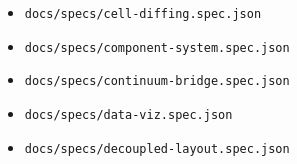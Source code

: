 \begin{itemize}
\item
  \texttt{d\allowbreak{}o\allowbreak{}c\allowbreak{}s\allowbreak{}/\allowbreak{}s\allowbreak{}p\allowbreak{}e\allowbreak{}c\allowbreak{}s\allowbreak{}/\allowbreak{}c\allowbreak{}e\allowbreak{}l\allowbreak{}l\allowbreak{}-\allowbreak{}d\allowbreak{}i\allowbreak{}f\allowbreak{}f\allowbreak{}i\allowbreak{}n\allowbreak{}g\allowbreak{}.\allowbreak{}s\allowbreak{}p\allowbreak{}e\allowbreak{}c\allowbreak{}.\allowbreak{}j\allowbreak{}s\allowbreak{}o\allowbreak{}n}
\item
  \texttt{d\allowbreak{}o\allowbreak{}c\allowbreak{}s\allowbreak{}/\allowbreak{}s\allowbreak{}p\allowbreak{}e\allowbreak{}c\allowbreak{}s\allowbreak{}/\allowbreak{}c\allowbreak{}o\allowbreak{}m\allowbreak{}p\allowbreak{}o\allowbreak{}n\allowbreak{}e\allowbreak{}n\allowbreak{}t\allowbreak{}-\allowbreak{}s\allowbreak{}y\allowbreak{}s\allowbreak{}t\allowbreak{}e\allowbreak{}m\allowbreak{}.\allowbreak{}s\allowbreak{}p\allowbreak{}e\allowbreak{}c\allowbreak{}.\allowbreak{}j\allowbreak{}s\allowbreak{}o\allowbreak{}n}
\item
  \texttt{d\allowbreak{}o\allowbreak{}c\allowbreak{}s\allowbreak{}/\allowbreak{}s\allowbreak{}p\allowbreak{}e\allowbreak{}c\allowbreak{}s\allowbreak{}/\allowbreak{}c\allowbreak{}o\allowbreak{}n\allowbreak{}t\allowbreak{}i\allowbreak{}n\allowbreak{}u\allowbreak{}u\allowbreak{}m\allowbreak{}-\allowbreak{}b\allowbreak{}r\allowbreak{}i\allowbreak{}d\allowbreak{}g\allowbreak{}e\allowbreak{}.\allowbreak{}s\allowbreak{}p\allowbreak{}e\allowbreak{}c\allowbreak{}.\allowbreak{}j\allowbreak{}s\allowbreak{}o\allowbreak{}n}
\item
  \texttt{d\allowbreak{}o\allowbreak{}c\allowbreak{}s\allowbreak{}/\allowbreak{}s\allowbreak{}p\allowbreak{}e\allowbreak{}c\allowbreak{}s\allowbreak{}/\allowbreak{}d\allowbreak{}a\allowbreak{}t\allowbreak{}a\allowbreak{}-\allowbreak{}v\allowbreak{}i\allowbreak{}z\allowbreak{}.\allowbreak{}s\allowbreak{}p\allowbreak{}e\allowbreak{}c\allowbreak{}.\allowbreak{}j\allowbreak{}s\allowbreak{}o\allowbreak{}n}
\item
  \texttt{d\allowbreak{}o\allowbreak{}c\allowbreak{}s\allowbreak{}/\allowbreak{}s\allowbreak{}p\allowbreak{}e\allowbreak{}c\allowbreak{}s\allowbreak{}/\allowbreak{}d\allowbreak{}e\allowbreak{}c\allowbreak{}o\allowbreak{}u\allowbreak{}p\allowbreak{}l\allowbreak{}e\allowbreak{}d\allowbreak{}-\allowbreak{}l\allowbreak{}a\allowbreak{}y\allowbreak{}o\allowbreak{}u\allowbreak{}t\allowbreak{}.\allowbreak{}s\allowbreak{}p\allowbreak{}e\allowbreak{}c\allowbreak{}.\allowbreak{}j\allowbreak{}s\allowbreak{}o\allowbreak{}n}

\end{itemize}
